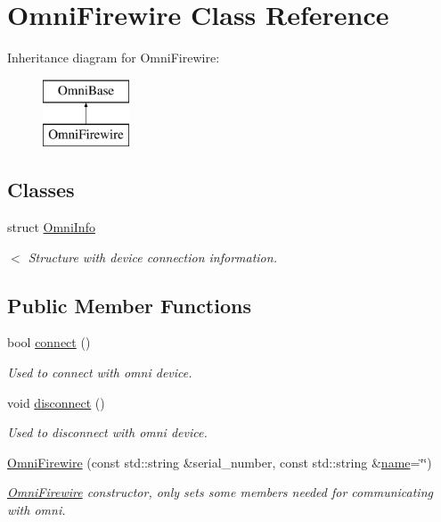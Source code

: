\hypertarget{classOmniFirewire}{\section{Omni\-Firewire Class Reference}
\label{classOmniFirewire}
}
Inheritance diagram for Omni\-Firewire\-:\begin{figure}[H]
\begin{center}
\leavevmode
\includegraphics[height=2.000000cm]{classOmniFirewire}
\end{center}
\end{figure}
\subsection*{Classes}
\begin{DoxyCompactItemize}
\item 
struct \hyperlink{structOmniFirewire_1_1OmniInfo}{Omni\-Info}
\begin{DoxyCompactList}\small\item\em $<$ Structure with device connection information. \end{DoxyCompactList}\end{DoxyCompactItemize}
\subsection*{Public Member Functions}
\begin{DoxyCompactItemize}
\item 
bool \hyperlink{classOmniFirewire_a5159a261f8a2a8a1e23e21ffc8b7d6d7}{connect} ()
\begin{DoxyCompactList}\small\item\em Used to connect with omni device. \end{DoxyCompactList}\item 
\hypertarget{classOmniFirewire_a7e8c7caaa494c1e0024cc3dbdeab5eee}{void \hyperlink{classOmniFirewire_a7e8c7caaa494c1e0024cc3dbdeab5eee}{disconnect} ()}\label{classOmniFirewire_a7e8c7caaa494c1e0024cc3dbdeab5eee}

\begin{DoxyCompactList}\small\item\em Used to disconnect with omni device. \end{DoxyCompactList}\item 
\hyperlink{classOmniFirewire_af9298dc3107550d4da86e4eb12fdfe09}{Omni\-Firewire} (const std\-::string \&serial\-\_\-number, const std\-::string \&\hyperlink{classOmniBase_a69efd9c11cdef64cbdcf57b52c6539f7}{name}=\char`\"{}\char`\"{})
\begin{DoxyCompactList}\small\item\em \hyperlink{classOmniFirewire}{Omni\-Firewire} constructor, only sets some members needed for communicating with omni. \end{DoxyCompactList}\end{DoxyCompactItemize}
